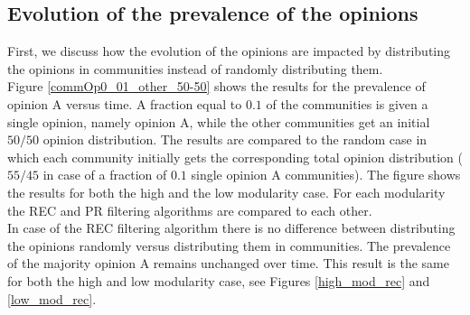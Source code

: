 \documentclass[11 pt , letterpaper , twoside , openright]{book}
\begin{document}
\subsection{Evolution of the prevalence of the opinions}\label{groupVSrandomOP}

First, we discuss how the evolution of the opinions are impacted by distributing the opinions in communities instead of randomly distributing them.\\
\newline
Figure \ref{commOp0_01_other_50-50} shows the results for the prevalence of opinion A versus time. A fraction equal to $0.1$ of the communities is given a single opinion, namely opinion A, while the other communities get an initial $50/50$ opinion distribution. The results are compared to the random case in which each community initially gets the corresponding total opinion distribution ($55/45$ in case of a fraction of $0.1$ single opinion A communities). The figure shows the results for both the high and the low modularity case. For each modularity the REC and PR filtering algorithms are compared to each other.\\
\newline
In case of the REC filtering algorithm there is no difference between distributing the opinions randomly versus distributing them in communities. The prevalence of the majority opinion A remains unchanged over time. This result is the same for both the high and low modularity case, see Figures \ref{high_mod_rec} and \ref{low_mod_rec}.\\
\newline
\end{document}
